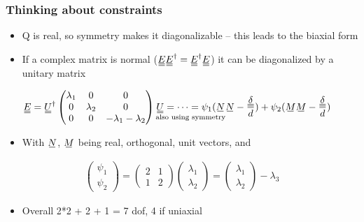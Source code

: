 \documentclass[10pt]{beamer}
\begin{document}
\begin{frame}
\frametitle{Thinking about constraints}
\begin{itemize}
    \item Q is real, so symmetry makes it diagonalizable -- this leads to the biaxial form
    \item If a complex matrix is normal ($\du{E}\du{E}^\dagger=\du{E}^\dagger\du{E}$) it can be diagonalized by a unitary matrix
\end{itemize}
\begin{align*}
    \du{E} &= \du{U}^\dagger \begin{pmatrix}
        \lambda_1 & 0 & 0 \\
        0 & \lambda_2 & 0 \\
        0 & 0 & - \lambda_1 - \lambda_2
    \end{pmatrix} \underset{\text{also using symmetry}}{\du{U} = \cdots = \psi_1(\su{N}}\su{N} - \frac{\du{\delta}}{d}) + \psi_2(\su{M}\su{M} - \frac{\du{\delta}}{d})
\end{align*}
\begin{itemize}
    \item With $\su{N}$, $\su{M}$ being real, orthogonal, unit vectors, and
\end{itemize}
\begin{align*}
    \begin{pmatrix} \psi_1 \\ \psi_2 \end{pmatrix} = \begin{pmatrix} 2 & 1 \\ 1 & 2 \end{pmatrix} \begin{pmatrix} \lambda_1 \\ \lambda_2 \end{pmatrix} = \begin{pmatrix} \lambda_1 \\ \lambda_2 \end{pmatrix} - \lambda_3
\end{align*}
\begin{itemize}
    \item Overall 2*2 + 2 + 1 = 7 dof, 4 if uniaxial
\end{itemize}
\end{frame}

\setlength{\abovedisplayskip}{1em}
\setlength{\belowdisplayskip}{0ex}
\end{document}
